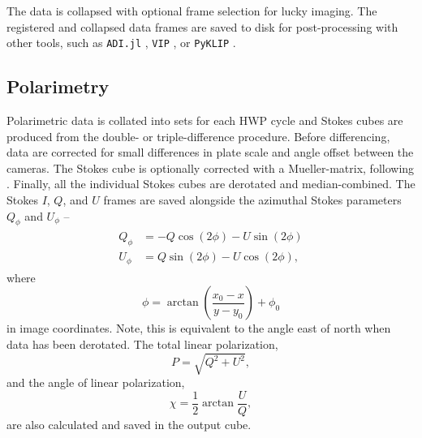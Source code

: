 The data is collapsed with optional frame selection for lucky imaging. The registered and collapsed data frames are saved to disk for post-processing with other tools, such as \texttt{ADI.jl} \citep{lucas_adijl_2020}, \texttt{VIP} \citep{gomez_gonzalez_vip_2017,christiaens_vip_2023}, or \texttt{PyKLIP} \citep{wang_pyklip_2015}.

\subsection{Polarimetry}

Polarimetric data is collated into sets for each HWP cycle and Stokes cubes are produced from the double- or triple-difference procedure. Before differencing, data are corrected for small differences in plate scale and angle offset between the cameras. The Stokes cube is optionally corrected with a Mueller-matrix, following \citet{holstein_polarimetric_2020,zhang_characterizing_2023}. Finally, all the individual Stokes cubes are derotated and median-combined. The Stokes $I$, $Q$, and $U$ frames are saved alongside the azimuthal Stokes parameters $Q_\phi$ and $U_\phi$ \citep{monnier_multiple_2019,boer_polarimetric_2020}--
\begin{align}
\begin{split}
    \label{eqn:az_stokes}
    Q_\phi &= -Q\cos{\left(2\phi\right)} - U\sin{\left(2\phi\right)} \\
    U_\phi &= Q\sin{\left(2\phi\right)} - U\cos{\left(2\phi\right)},
\end{split}
\end{align}
where
\begin{equation}
    \phi = \arctan{\left( \frac{x_0 - x}{y - y_0} \right)} + \phi_0
\end{equation}
in image coordinates. Note, this is equivalent to the angle east of north when data has been derotated. The total linear polarization,
\begin{equation}
    P = \sqrt{Q^2 + U^2},
\end{equation}
and the angle of linear polarization,
\begin{equation}
    \chi = \frac12\arctan{\frac{U}{Q}},
\end{equation}
are also calculated and saved in the output cube.